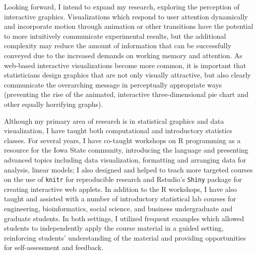 \documentclass[11pt,letterpaper,sans,unicode]{moderncv}        %
\begin{document}
\vspace{.25cm}
Looking forward, I intend to expand my research, exploring the perception of interactive graphics. Visualizations which respond to user attention dynamically and incorporate motion through animation or other transitions have the potential to more intuitively communicate experimental results, but the additional complexity may reduce the amount of information that can be successfully conveyed due to the increased demands on working memory and attention. As web-based interactive visualizations become more common, it is important that statisticians design graphics that are not only visually attractive, but also clearly communicate the overarching message in perceptually appropriate ways (preventing the rise of the animated, interactive three-dimensional pie chart and other equally horrifying graphs). 


\vspace{.5cm}
Although my primary area of research is in statistical graphics and data visualization, I have taught both computational and introductory statistics classes. For several years, I have co-taught workshops on R programming as a resource for the Iowa State community, introducing the language and presenting advanced topics including data visualization, formatting and arranging data for analysis, linear models; I also designed and helped to teach more targeted courses on the use of \texttt{knitr} for reproducible research and Rstudio's \texttt{Shiny} package for creating interactive web applets. In addition to the R workshops, I have also taught and assisted with a number of introductory statistical lab courses for engineering, bioinformatics, social science, and business undergraduate and graduate students. In both settings, I utilized frequent examples which allowed students to independently apply the course material in a guided setting, reinforcing students' understanding of the material and providing opportunities for self-assessment and feedback. 
\end{document}

